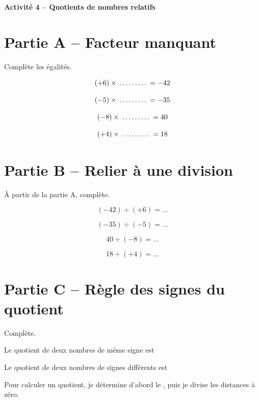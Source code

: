 \documentclass[12pt,a4paper]{article}
\newcommand{\titreseq}[1]{%
\begin{center}
  {\sffamily\large\bfseries\color{SavoirC}#1}
\end{center}
}
\begin{document}
\titreseq{Activité 4 -- Quotients de nombres relatifs}

\noindent
\begin{minipage}[t]{0.49\linewidth}

\section*{Partie A -- Facteur manquant}

Complète les égalités.

\[
(+6)\times\makebox[1.5cm]{\dotfill}=-42
\]


\[
(-5)\times\makebox[1.5cm]{\dotfill}=-35
\]

\[
(-8)\times\makebox[1.5cm]{\dotfill}=40
\]

\[
(+4)\times\makebox[1.5cm]{\dotfill}=18
\]

\end{minipage}\hfill
\begin{minipage}[t]{0.49\linewidth}

\section*{Partie B -- Relier à une division}

À partir de la partie A, complète.

\[
(-42)\div(+6)=\ldots
\]

\[
(-35)\div(-5)=\ldots
\]

\[
40\div(-8)=\ldots
\]

\[
18\div(+4)=\ldots
\]

\end{minipage}


\section*{Partie C -- Règle des signes du quotient}

Complète.

\begin{tcolorbox}[colback=SavoirC!5,colframe=SavoirC!60,boxrule=0.7pt,arc=2mm]
Le quotient de deux nombres de même signe est \dotfill

\vspace{0.4cm}

Le quotient de deux nombres de signes différents est \dotfill

\vspace{0.4cm}

Pour calculer un quotient, je détermine d'abord le \dotfill, puis je divise les distances à zéro.
\end{tcolorbox}
\end{document}
